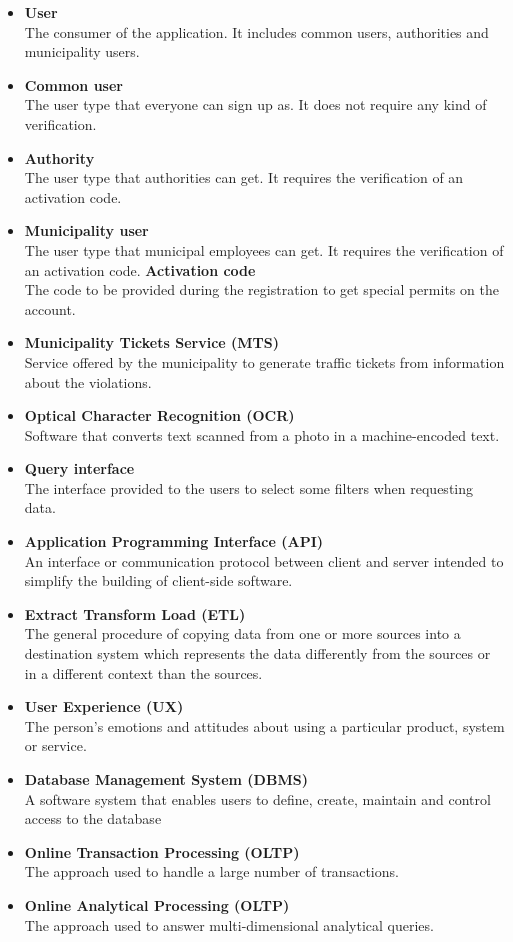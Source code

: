\documentclass[./main.tex]{subfiles}
\begin{document}
\begin{itemize}
\item
  \textbf{User}\\
  The consumer of the application. It includes common users, authorities
  and municipality users.
\item
  \textbf{Common user}\\
  The user type that everyone can sign up as. It does not require any
  kind of verification.
\item
  \textbf{Authority}\\
  The user type that authorities can get. It requires the verification
  of an activation code.
\item
  \textbf{Municipality user}\\
  The user type that municipal employees can get. It requires the
  verification of an activation code.
\textbf{Activation code}\\
  The code to be provided during the registration to get special permits
  on the account.
\item
  \textbf{Municipality Tickets Service (MTS)}\\
  Service offered by the municipality to generate traffic tickets from
  information about the violations.
\item
  \textbf{Optical Character Recognition (OCR)}\\
  Software that converts text scanned from a photo in a machine-encoded
  text.
\item
  \textbf{Query interface}\\
  The interface provided to the users to select some filters when
  requesting data.
\item
  \textbf{Application Programming Interface (API)}\\
  An interface or communication protocol between client and server
  intended to simplify the building of client-side software.
\item
  \textbf{Extract Transform Load (ETL)}\\
  The general procedure of copying data from one or more sources into a
  destination system which represents the data differently from the
  sources or in a different context than the sources.
\item
  \textbf{User Experience (UX)}\\
  The person's emotions and attitudes about using a particular product, system
  or service.
\item
  \textbf{Database Management System (DBMS)}\\
  A software system that enables users to define, create, maintain and
  control access to the database
\item
  \textbf{Online Transaction Processing (OLTP)}\\
  The approach used to handle a large number of transactions.
\item
  \textbf{Online Analytical Processing (OLTP)}\\
  The approach used to answer multi-dimensional analytical queries.
\end{itemize}
\end{document}
